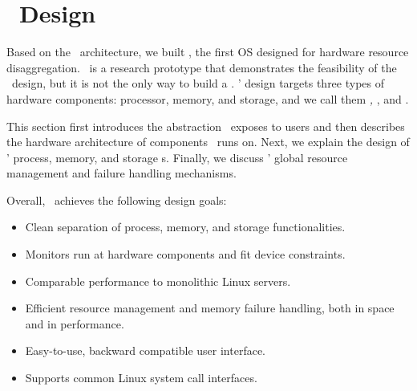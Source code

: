 \section{\lego\ Design}
\label{sec:lego:design}

Based on the \splitkernel\ architecture,
we built {\em \lego}, the first OS designed for hardware resource disaggregation.
\lego\ is a research prototype that demonstrates the feasibility of the \splitkernel\ design,
but it is not the only way to build a \splitkernel.
\lego' design targets three types of hardware components:
processor, memory, and storage,
and we call them {\em \pcomponent, \mcomponent}, and {\em \scomponent}.

This section first introduces the abstraction \lego\ exposes to users
and then describes the hardware architecture of components \lego\ runs on.
Next, we explain the design of \lego' process, memory, and storage \microos{}s.
Finally, we discuss \lego' global resource management and failure handling mechanisms.

Overall, \lego\ achieves the following design goals:

\begin{itemize}

\vspace{-0.1in}

\item Clean separation of process, memory, and storage functionalities.
\vspace{-0.1in}

\item Monitors run at hardware components and fit device constraints.
\vspace{-0.1in}

\item Comparable performance to monolithic Linux servers.
\vspace{-0.1in}

\item Efficient resource management and memory failure handling, both in space and in performance. %
\vspace{-0.1in}

\item Easy-to-use, backward compatible user interface.
\vspace{-0.1in}

\item Supports common Linux system call interfaces.
\vspace{-0.1in}

\end{itemize}

